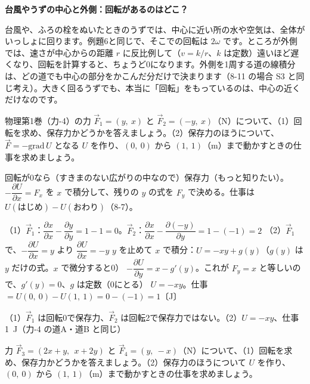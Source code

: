 \begin{motto}[5]
\textbf{台風やうずの中心と外側：回転があるのはどこ？}\par
台風や、ふろの栓をぬいたときのうずでは、中心に近い所の水や空気は、全体がいっしょに回ります。例題6と同じで、そこでの回転は $2\omega$ です。ところが外側では、速さが中心からの距離 $r$ に反比例して（$v=k/r$、$k$ は定数）遠いほど遅くなり、回転を計算すると、ちょうど0になります。外側を1周する道の線積分は、どの道でも中心の部分をかこんだ分だけで決まります（8-11 の場合 S3 と同じ考え）。大きく回るうずでも、本当に「回転」をもっているのは、中心の近くだけなのです。
\end{motto}

\begin{reidai}
物理第1巻（力-4）の力 $\vec F_1=(y,\ x)$ と $\vec F_2=(-y,\ x)$（N）について、（1）回転を求め、保存力かどうかを答えましょう。（2）保存力のほうについて、$\vec F=-\mathrm{grad}\,U$ となる $U$ を作り、$(0,\ 0)$ から $(1,\ 1)$（m）まで動かすときの仕事を求めましょう。\par
\kangaekata 回転が0なら（すきまのない広がりの中なので）保存力（もっと知りたい）。$-\dfrac{\partial U}{\partial x}=F_x$ を $x$ で積分して、残りの $y$ の式を $F_y$ で決める。仕事は $U(\text{はじめ})-U(\text{おわり})$（8-7）。\par
\shiki（1）$\vec F_1$：$\dfrac{\partial x}{\partial x}-\dfrac{\partial y}{\partial y}=1-1=0$。$\vec F_2$：$\dfrac{\partial x}{\partial x}-\dfrac{\partial(-y)}{\partial y}=1-(-1)=2$\kviiikq
（2）$\vec F_1$ で、$-\dfrac{\partial U}{\partial x}=y$ より $\dfrac{\partial U}{\partial x}=-y$\kviiikq
$y$ を止めて $x$ で積分：$U=-xy+g(y)$（$g(y)$ は $y$ だけの式。$x$ で微分すると0）\kviiikq
$-\dfrac{\partial U}{\partial y}=x-g'(y)$。これが $F_y=x$ と等しいので、$g'(y)=0$、$g$ は定数（0にとる）\kviiikq
$U=-xy$。仕事 $=U(0,\ 0)-U(1,\ 1)=0-(-1)=1$〔J〕\par
\kotae（1）\nobreak $\vec F_1$ は回転0で保存力、$\vec F_2$ は回転2で保存力ではない。（2）\nobreak $U=-xy$、仕事 \qty{1}{J}（力-4 の道A・道B と同じ）
\end{reidai}

\begin{jibun}
力 $\vec F_3=(2x+y,\ \ x+2y)$ と $\vec F_4=(y,\ -x)$（N）について、（1）回転を求め、保存力かどうかを答えましょう。（2）保存力のほうについて $U$ を作り、$(0,\ 0)$ から $(1,\ 1)$（m）まで動かすときの仕事を求めましょう。
\end{jibun}

